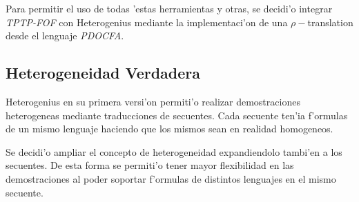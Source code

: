 Para permitir el uso de todas 'estas herramientas y otras, se decidi'o integrar \textit{TPTP-FOF} con Heterogenius mediante la implementaci'on de una $\rho-$translation desde el lenguaje \textit{PDOCFA}.


\subsection{Heterogeneidad Verdadera}

Heterogenius en su primera versi'on permiti'o realizar demostraciones heterogeneas mediante traducciones de secuentes. Cada secuente ten'ia f'ormulas de un mismo lenguaje haciendo que los mismos sean en realidad homogeneos.

Se decidi'o ampliar el concepto de heterogeneidad expandiendolo tambi'en a los secuentes. De esta forma se permiti'o tener mayor flexibilidad en las demostraciones al poder soportar f'ormulas de distintos lenguajes en el mismo secuente.
